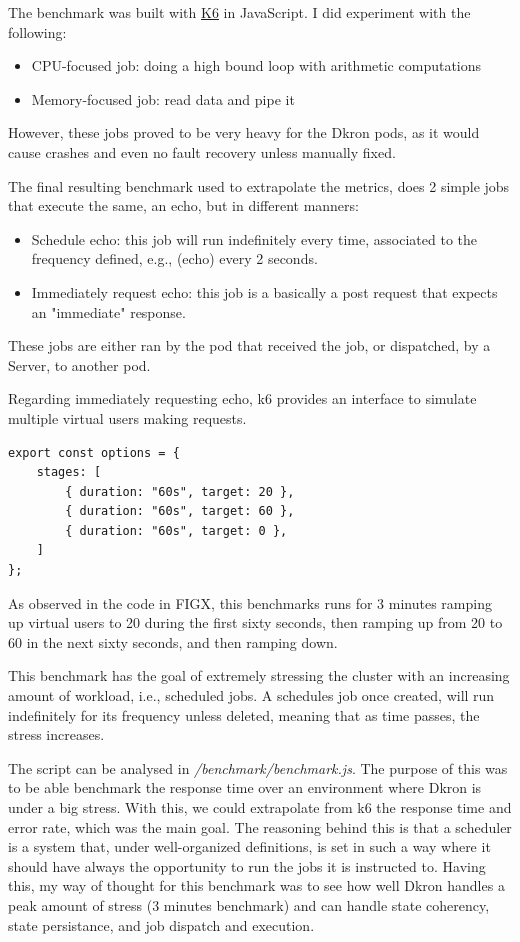 \documentclass[runningheads]{llncs}
\begin{document}
The benchmark was built with \href{https://k6.io/docs/}{K6} in JavaScript. I did experiment with
the following:
\begin{itemize}
    \item CPU-focused job: doing a high bound loop with arithmetic computations
    \item Memory-focused job: read data and pipe it
\end{itemize}

However, these jobs proved to be very heavy for the Dkron pods, as it would cause crashes and even no
fault recovery unless manually fixed.

The final resulting benchmark used to extrapolate the metrics, does 2 simple jobs
that execute the same, an echo, but in different manners:
\begin{itemize}
    \item Schedule echo: this job will run indefinitely every time, associated to
    the frequency defined, e.g., (echo) every 2 seconds.
    \item Immediately request echo: this job is a basically a post request that expects an "immediate"
    response.
\end{itemize}

These jobs are either ran by the pod that received the job, or dispatched, by a Server, to another pod.

Regarding immediately requesting echo, k6 provides an interface to simulate multiple virtual users
making requests.

\begin{verbatim}
export const options = {
    stages: [
        { duration: "60s", target: 20 },
        { duration: "60s", target: 60 },
        { duration: "60s", target: 0 },
    ]
};
\end{verbatim}

As observed in the code in FIGX, this benchmarks runs for 3 minutes ramping up virtual
users to 20 during the first sixty seconds, then ramping up from 20 to 60 in the next sixty seconds,
and then ramping down.

This benchmark has the goal of extremely stressing the cluster with an increasing amount of
workload, i.e., scheduled jobs. A schedules job once created, will run indefinitely for its frequency
unless deleted, meaning that as time passes, the stress increases.

The script can be analysed in \textit{/benchmark/benchmark.js}.
The purpose of this was to be able benchmark the response time over an environment where Dkron
is under a big stress. With this, we could extrapolate from k6 the response time and error rate,
which was the main goal. The reasoning behind this is that a scheduler is a system that, under
well-organized definitions, is set in such a way where it should have always the opportunity to
run the jobs it is instructed to. Having this, my way of thought for this benchmark was to
see how well Dkron handles a peak amount of stress (3 minutes benchmark) and can handle
state coherency, state persistance, and job dispatch and execution.
\end{document}
